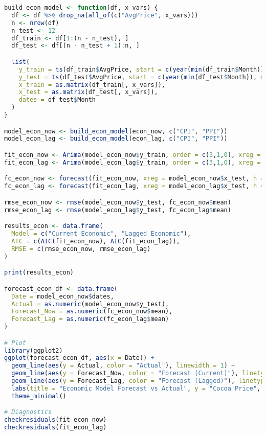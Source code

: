 \begin{lstlisting}[language=R]
build_econ_model <- function(df, x_vars) {
  df <- df %>% drop_na(all_of(c("AvgPrice", x_vars)))
  n <- nrow(df)
  n_test <- 12
  df_train <- df[1:(n - n_test), ]
  df_test <- df[(n - n_test + 1):n, ]

  list(
    y_train = ts(df_train$AvgPrice, start = c(year(min(df_train$Month)), month(min(df_train$Month))), frequency = 12),
    y_test = ts(df_test$AvgPrice, start = c(year(min(df_test$Month)), month(min(df_test$Month))), frequency = 12),
    x_train = as.matrix(df_train[, x_vars]),
    x_test = as.matrix(df_test[, x_vars]),
    dates = df_test$Month
  )
}

model_econ_now <- build_econ_model(econ_now, c("CPI", "PPI"))
model_econ_lag <- build_econ_model(econ_lag, c("CPI", "PPI"))

fit_econ_now <- Arima(model_econ_now$y_train, order = c(3,1,0), xreg = model_econ_now$x_train)
fit_econ_lag <- Arima(model_econ_lag$y_train, order = c(3,1,0), xreg = model_econ_lag$x_train)

fc_econ_now <- forecast(fit_econ_now, xreg = model_econ_now$x_test, h = 12)
fc_econ_lag <- forecast(fit_econ_lag, xreg = model_econ_lag$x_test, h = 12)

rmse_econ_now <- rmse(model_econ_now$y_test, fc_econ_now$mean)
rmse_econ_lag <- rmse(model_econ_lag$y_test, fc_econ_lag$mean)

results_econ <- data.frame(
  Model = c("Current Economic", "Lagged Economic"),
  AIC = c(AIC(fit_econ_now), AIC(fit_econ_lag)),
  RMSE = c(rmse_econ_now, rmse_econ_lag)
)

print(results_econ)

forecast_econ_df <- data.frame(
  Date = model_econ_now$dates,
  Actual = as.numeric(model_econ_now$y_test),
  Forecast_Now = as.numeric(fc_econ_now$mean),
  Forecast_Lag = as.numeric(fc_econ_lag$mean)
)

# Plot
library(ggplot2)
ggplot(forecast_econ_df, aes(x = Date)) +
  geom_line(aes(y = Actual, color = "Actual"), linewidth = 1) +
  geom_line(aes(y = Forecast_Now, color = "Forecast (Current)"), linetype = "dotted", linewidth = 1) +
  geom_line(aes(y = Forecast_Lag, color = "Forecast (Lagged)"), linetype = "dashed", linewidth = 1) +
  labs(title = "Economic Model Forecast vs Actual", y = "Cocoa Price", x = "Date", color = "Legend") +
  theme_minimal()

# Diagnostics
checkresiduals(fit_econ_now)
checkresiduals(fit_econ_lag)


\end{lstlisting}